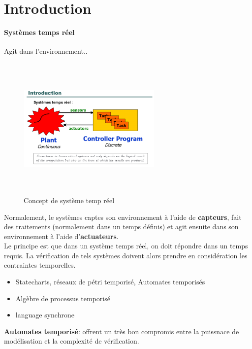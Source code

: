 \documentclass[oneside]{book}
\begin{document}
    \section{Introduction}
    \paragraph{Systèmes temps réel} Agit dans l'environnement.. \\
    \begin{figure}[!ht]
    	\centering
    	\includegraphics[width = 7cm, height = 7cm, keepaspectratio]{Images/real_time_systems.png}
    	\caption{Concept de système temp réel}
    	\label{fig:RealTimeSystems}
    \end{figure}
    
    Normalement, le systèmes captes son environnement à l'aide de \textbf{capteurs}, fait des traitements (normalement dans un temps définis) et agit ensuite dans son environnement à l'aide d'\textbf{actuateurs}.\\
    
    Le principe est que dans un système temps réel, on doit répondre dans un temps requis. La vérification de tels systèmes doivent alors prendre en considération les contraintes temporelles.\\
    \begin{itemize}
        \item Statecharts, réseaux de pétri temporisé, Automates temporisés
        \item Algèbre de processus temporisé
        \item language synchrone
    \end{itemize}
    \textbf{Automates temporisé}: offrent un très bon compromis entre la puissnace de modélisation et la complexité de vérification.\\
    
\end{document}
